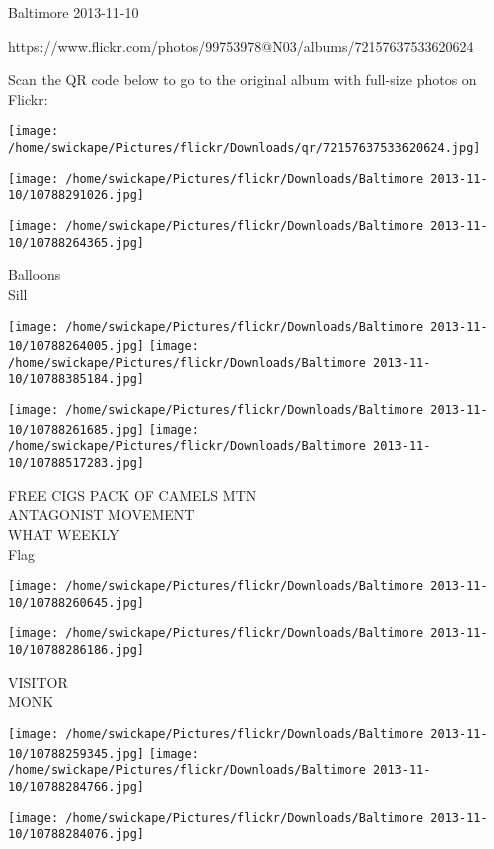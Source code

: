 \documentclass[10pt,letterpaper]{article}
\begin{document}
Baltimore 2013-11-10

https://www.flickr.com/photos/99753978@N03/albums/72157637533620624

Scan the QR code below to go to the original album with full-size photos on Flickr:

\texttt{[image: /home/swickape/Pictures/flickr/Downloads/qr/72157637533620624.jpg]}
\pagebreak

\texttt{[image: /home/swickape/Pictures/flickr/Downloads/Baltimore 2013-11-10/10788291026.jpg]}

\vspace{0.25in}
\texttt{[image: /home/swickape/Pictures/flickr/Downloads/Baltimore 2013-11-10/10788264365.jpg]}

Balloons\\
Sill
\pagebreak

\texttt{[image: /home/swickape/Pictures/flickr/Downloads/Baltimore 2013-11-10/10788264005.jpg]}
\texttt{[image: /home/swickape/Pictures/flickr/Downloads/Baltimore 2013-11-10/10788385184.jpg]}

\texttt{[image: /home/swickape/Pictures/flickr/Downloads/Baltimore 2013-11-10/10788261685.jpg]}
\texttt{[image: /home/swickape/Pictures/flickr/Downloads/Baltimore 2013-11-10/10788517283.jpg]}

FREE CIGS PACK OF CAMELS MTN\\
ANTAGONIST MOVEMENT\\
WHAT WEEKLY\\
Flag
\pagebreak

\texttt{[image: /home/swickape/Pictures/flickr/Downloads/Baltimore 2013-11-10/10788260645.jpg]}

\vspace{0.25in}
\texttt{[image: /home/swickape/Pictures/flickr/Downloads/Baltimore 2013-11-10/10788286186.jpg]}

VISITOR\\
MONK
\pagebreak

\texttt{[image: /home/swickape/Pictures/flickr/Downloads/Baltimore 2013-11-10/10788259345.jpg]}
\texttt{[image: /home/swickape/Pictures/flickr/Downloads/Baltimore 2013-11-10/10788284766.jpg]}

\vspace{0.25in}
\texttt{[image: /home/swickape/Pictures/flickr/Downloads/Baltimore 2013-11-10/10788284076.jpg]}
\end{document}
